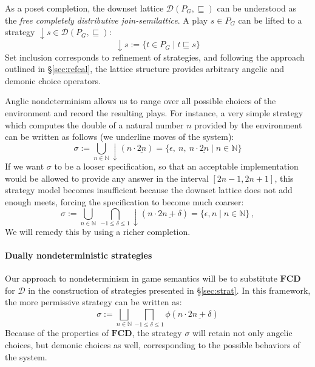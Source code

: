 \documentclass[sigplan,10pt,review,anonymous]{acmart}
\begin{document}
As a poset completion,
the downset lattice
$\mathcal{D}(P_G, {\sqsubseteq})$
can be understood as
the \emph{free completely distributive join-semilattice}.
A play $s \in P_G$ can be lifted to a strategy
${\downarrow} s \in \mathcal{D}(P_G, {\sqsubseteq})$:
\[
    {\downarrow} s := \{ t \in P_G \mid t \sqsubseteq s \}
\]
Set inclusion corresponds to refinement of strategies,
and following the approach outlined in \S\ref{sec:refcal},
the lattice structure provides
arbitrary angelic and demonic choice operators.

Anglic nondeterminism
allows us to range over all possible choices of the environment
and record the resulting plays.
For instance,
a very simple strategy which computes
the double of a natural number $n$
provided by the environment
can be written as follows
(we underline moves of the system):
\[
  \sigma :=
    \bigcup_{n \in \mathbb{N}} {\downarrow}(n \cdot \underline{2n}) =
    \{ \epsilon, \: n, \: n \cdot \underline{2n} \mid n \in \mathbb{N} \}
\]
If we want $\sigma$ to be a looser specification,
so that an acceptable implementation
would be allowed to provide any answer in the interval
$[2n - 1, 2n + 1]$,
this strategy model becomes insufficient
because the downset lattice does not add enough meets,
forcing the specification to become
much coarser:
\[
  \sigma :=
    \bigcup_{n \in \mathbb{N}} \:
    \bigcap_{-1 \le \delta \le 1}
    {\downarrow}(n \cdot \underline{2n+\delta}) =
    \{ \epsilon, n \mid n \in \mathbb{N} \} \,,
\]
We will remedy this by using a richer completion.


\paragraph{Dually nondeterministic strategies} %

Our approach to nondeterminism in game semantics
will be to substitute $\mathbf{FCD}$ for $\mathcal{D}$
in the construction of strategies presented in \S\ref{sec:strat}.
In this framework,
the more permissive strategy
can be written as:
\[
  \sigma :=
    \bigsqcup_{n \in \mathbb{N}}
    \bigsqcap_{-1 \le \delta \le 1}
    \phi(n \cdot \underline{2n + \delta})
\]
Because of the properties of $\mathbf{FCD}$,
the strategy $\sigma$ will retain
not only angelic choices,
but demonic choices as well,
corresponding to the possible behaviors
of the system.
\end{document}
